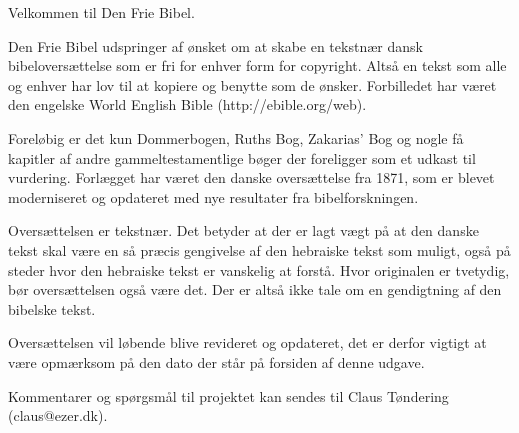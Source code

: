 Velkommen til Den Frie Bibel.

Den Frie Bibel udspringer af ønsket om at skabe en tekstnær dansk bibeloversættelse som er fri for
enhver form for copyright. Altså en tekst som alle og enhver har lov til at kopiere og benytte som
de ønsker. Forbilledet har været den engelske World English Bible (http://ebible.org/web).

Foreløbig er det kun Dommerbogen, Ruths Bog, Zakarias' Bog og nogle få kapitler af andre
gammeltestamentlige bøger der foreligger som et udkast til vurdering. Forlægget har været den danske
oversættelse fra 1871, som er blevet moderniseret og opdateret med nye resultater fra
bibelforskningen.

Oversættelsen er tekstnær. Det betyder at der er lagt vægt på at den danske tekst skal være en så
præcis gengivelse af den hebraiske tekst som muligt, også på steder hvor den hebraiske tekst er
vanskelig at forstå. Hvor originalen er tvetydig, bør oversættelsen også være det. Der er altså ikke
tale om en gendigtning af den bibelske tekst.

Oversættelsen vil løbende blive revideret og opdateret, det er derfor vigtigt at være opmærksom på
den dato der står på forsiden af denne udgave.

Kommentarer og spørgsmål til projektet kan sendes til Claus Tøndering (claus@ezer.dk).
